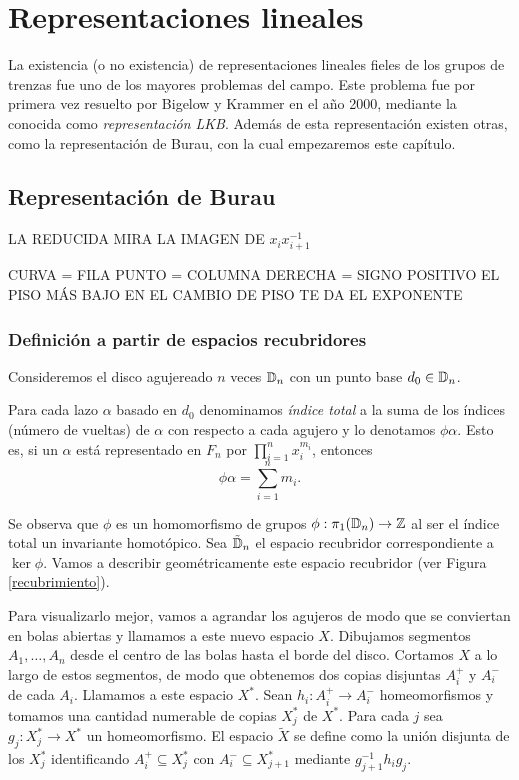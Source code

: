 \documentclass[TFG.tex]{subfiles}
\begin{document}
\chapter{Representaciones lineales}

La existencia (o no existencia) de representaciones lineales fieles de los grupos de trenzas fue uno de los mayores problemas del campo. Este problema fue por primera vez resuelto por Bigelow \cite{Bigelow} y Krammer \cite{Krammer} en el año 2000, mediante la conocida como \emph{representación LKB}. Además de esta representación existen otras, como la representación de Burau, con la cual empezaremos este capítulo.

\section{Representación de Burau}

LA REDUCIDA MIRA LA IMAGEN DE $x_ix_{i+1}^{-1}$ 

CURVA = FILA
PUNTO = COLUMNA
DERECHA = SIGNO POSITIVO
EL PISO MÁS BAJO EN EL CAMBIO DE PISO TE DA EL EXPONENTE

\subsection{Definición a partir de espacios recubridores}

Consideremos el disco agujereado $n$ veces $\mathbb{D}_n$ con un punto base $d_0\in\mathbb{D}_n$. 
\begin{defi}
Para cada lazo $\alpha$ basado en $d_0$ denominamos \emph{índice total}  a la suma de los índices (número de vueltas) de $\alpha$ con respecto a cada agujero y lo denotamos $\phi\alpha$. Esto es, si un $\alpha$ está representado en $F_n$ por $\prod_{i=1}^n x_i^{m_i}$, entonces 
\[
\phi\alpha=\sum_{i=1}^nm_i.
\]
\end{defi}

Se observa que $\phi$ es un homomorfismo de grupos $\phi:\pi_1(\mathbb{D}_n)\to\mathbb{Z}$ al ser el índice total un invariante homotópico. Sea $\tilde{\mathbb{D}}_n$ el espacio recubridor correspondiente a $\ker\phi$. Vamos a describir geométricamente este espacio recubridor (ver Figura \ref{recubrimiento}). 


Para visualizarlo mejor, vamos a agrandar los agujeros de modo que se conviertan en bolas abiertas y llamamos a este nuevo espacio $X$. Dibujamos segmentos $A_1,\dots, A_n$ desde el centro de las bolas hasta el borde del disco. Cortamos $X$ a lo largo de estos segmentos, de modo que obtenemos dos copias disjuntas $A_i^+$ y $A_i^-$ de cada $A_i$. Llamamos a este espacio $X^*$. Sean $h_i:A_i^+\to A_i^-$ homeomorfismos y tomamos una cantidad numerable de copias $X^*_j$ de $X^*$. Para cada $j$ sea $g_j:X^*_j\to X^*$ un homeomorfismo. El espacio $\tilde{X}$ se define como la unión disjunta de los $X^*_j$ identificando $A_i^+\subseteq X^*_j$ con $A_i^-\subseteq X^*_{j+1}$ mediante $g_{j+1}^{-1}h_ig_j$.
\end{document}
